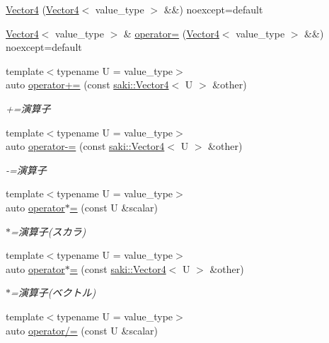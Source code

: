 \begin{DoxyCompactItemize}
\mbox{\hyperlink{classsaki_1_1_vector4_a52a0d7f95e04f19c6e9f00116e4af550}{Vector4}} (\mbox{\hyperlink{classsaki_1_1_vector4}{Vector4}}$<$ value\+\_\+type $>$ \&\&) noexcept=default
\item 
\mbox{\hyperlink{classsaki_1_1_vector4}{Vector4}}$<$ value\+\_\+type $>$ \& \mbox{\hyperlink{classsaki_1_1_vector4_a6db19f1cf96ebc366014f6bec2b7801c}{operator=}} (\mbox{\hyperlink{classsaki_1_1_vector4}{Vector4}}$<$ value\+\_\+type $>$ \&\&) noexcept=default
\item 
{\footnotesize template$<$typename U  = value\+\_\+type$>$ }\\auto \mbox{\hyperlink{classsaki_1_1_vector4_ae790a71f69947ad55e7d6f83a3138322}{operator+=}} (const \mbox{\hyperlink{classsaki_1_1_vector4}{saki\+::\+Vector4}}$<$ U $>$ \&other)
\begin{DoxyCompactList}\small\item\em +=演算子 \end{DoxyCompactList}\item 
{\footnotesize template$<$typename U  = value\+\_\+type$>$ }\\auto \mbox{\hyperlink{classsaki_1_1_vector4_aa8473ee1b9c23057f80bb31ce5b7641e}{operator-\/=}} (const \mbox{\hyperlink{classsaki_1_1_vector4}{saki\+::\+Vector4}}$<$ U $>$ \&other)
\begin{DoxyCompactList}\small\item\em -\/=演算子 \end{DoxyCompactList}\item 
{\footnotesize template$<$typename U  = value\+\_\+type$>$ }\\auto \mbox{\hyperlink{classsaki_1_1_vector4_a0d2783b04b8c25139339345eacedd2d6}{operator$\ast$=}} (const U \&scalar)
\begin{DoxyCompactList}\small\item\em $\ast$=演算子(スカラ) \end{DoxyCompactList}\item 
{\footnotesize template$<$typename U  = value\+\_\+type$>$ }\\auto \mbox{\hyperlink{classsaki_1_1_vector4_ad456668b67b242d856cf92f79ff454b3}{operator$\ast$=}} (const \mbox{\hyperlink{classsaki_1_1_vector4}{saki\+::\+Vector4}}$<$ U $>$ \&other)
\begin{DoxyCompactList}\small\item\em $\ast$=演算子(ベクトル) \end{DoxyCompactList}\item 
{\footnotesize template$<$typename U  = value\+\_\+type$>$ }\\auto \mbox{\hyperlink{classsaki_1_1_vector4_ad02ea8316a175e5954c51504e021db34}{operator/=}} (const U \&scalar)

\end{DoxyCompactItemize}
